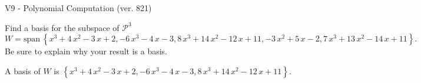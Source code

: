 \begin{exercise}
  \begin{exerciseTitle}V9 - Polynomial Computation (ver. 821)\end{exerciseTitle}
  \begin{exerciseStatement}
    Find a basis for the subspace of \(\mathcal{P}^3\) 
\[W=\mathrm{span}\ \left\{x^{3} + 4 \, x^{2} - 3 \, x + 2 , -6 \, x^{3} - 4 \, x - 3 , 8 \, x^{3} + 14 \, x^{2} - 12 \, x + 11 , -3 \, x^{2} + 5 \, x - 2 , 7 \, x^{3} + 13 \, x^{2} - 14 \, x + 11\right\}.\]
 Be sure to explain why your result is a basis.


  \end{exerciseStatement}
  \begin{exerciseAnswer}
   A basis of \(W\) is  \(\left\{x^{3} + 4 \, x^{2} - 3 \, x + 2 , -6 \, x^{3} - 4 \, x - 3 , 8 \, x^{3} + 14 \, x^{2} - 12 \, x + 11\right\}\).
  


  \end{exerciseAnswer}
\end{exercise}